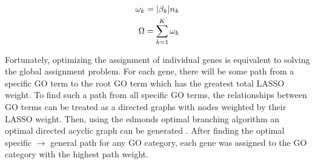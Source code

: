 \begin{align}
\omega_{k} = |\beta_{k}|n_{k}\notag\\
\Omega = \sum_{k = 1}^{K}\omega_{k}\label{eq:lassoOptimProb}
\end{align}

Fortunately, optimizing the assignment of individual genes is equivalent to solving the global assignment problem. For each gene, there will be some path from a specific GO term to the root GO term which has the greatest total LASSO weight. To find such a path from all specific GO terms, the relationships between GO terms can be treated as a directed graphs with nodes weighted by their LASSO weight. Then, using the edmonds optimal branching algorithm an optimal directed acyclic graph can be generated \cite{Edmonds:1967ta}. After finding the optimal specific $\rightarrow$ general path for any GO category, each gene was assigned to the GO category with the highest path weight.